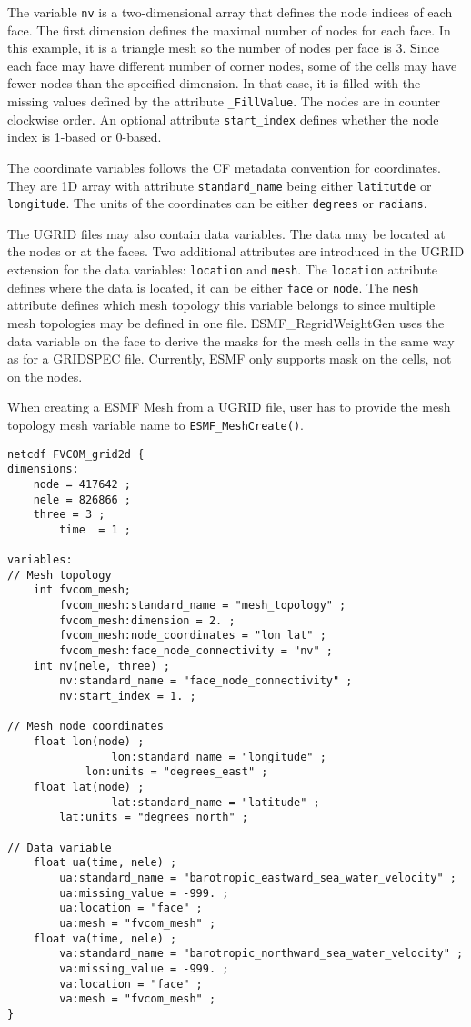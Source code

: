 The variable {\tt nv} is a two-dimensional array that defines the node indices of each face. The first dimension 
defines the maximal number of nodes for each face. In this example, it is a 
triangle mesh so the number of nodes per face is 3.  Since each face may have different number of corner nodes,
some of the cells may have fewer nodes than the specified dimension. In that case, it is filled with the 
missing values defined by the attribute {\tt \_FillValue}.  The nodes are in counter clockwise order.  An optional attribute 
{\tt start\_index} defines whether the node index is 1-based or 0-based.

The coordinate variables follows the CF metadata convention for coordinates.  They are 1D array with attribute 
{\tt standard\_name} being either {\tt latitutde} or {\tt longitude}.  The units of the coordinates can be either {\tt degrees} or {\tt radians}.

The UGRID files may also contain data variables.  The data may be located at the nodes or at the faces.  Two additional attributes are introduced in the UGRID extension for the data variables:  {\tt location} and {\tt mesh}.  The {\tt location}
attribute defines where the data is located, it can be either {\tt face} or {\tt node}.  The {\tt mesh} attribute defines which mesh topology this variable belongs to since multiple mesh topologies may be defined in one
file.  ESMF\_RegridWeightGen uses the data variable on the face to derive the masks for the mesh cells 
in the same way as for a GRIDSPEC file.  Currently, ESMF only supports mask on the cells, not on the nodes.   

When creating a ESMF Mesh from a UGRID file, user has to provide the mesh topology mesh variable name to {\tt ESMF\_MeshCreate()}.

\begin{verbatim}
netcdf FVCOM_grid2d {
dimensions:
	node = 417642 ;
	nele = 826866 ;
	three = 3 ;
        time  = 1 ;

variables:
// Mesh topology
	int fvcom_mesh;
		fvcom_mesh:standard_name = "mesh_topology" ;
		fvcom_mesh:dimension = 2. ;
		fvcom_mesh:node_coordinates = "lon lat" ;
		fvcom_mesh:face_node_connectivity = "nv" ;
	int nv(nele, three) ;
		nv:standard_name = "face_node_connectivity" ;
		nv:start_index = 1. ;

// Mesh node coordinates
	float lon(node) ;
                lon:standard_name = "longitude" ;
	        lon:units = "degrees_east" ;
	float lat(node) ;
                lat:standard_name = "latitude" ;
		lat:units = "degrees_north" ;

// Data variable
	float ua(time, nele) ;
		ua:standard_name = "barotropic_eastward_sea_water_velocity" ;
		ua:missing_value = -999. ;
		ua:location = "face" ;
		ua:mesh = "fvcom_mesh" ;
	float va(time, nele) ;
		va:standard_name = "barotropic_northward_sea_water_velocity" ;
		va:missing_value = -999. ;
		va:location = "face" ;
		va:mesh = "fvcom_mesh" ;
}
\end{verbatim}

